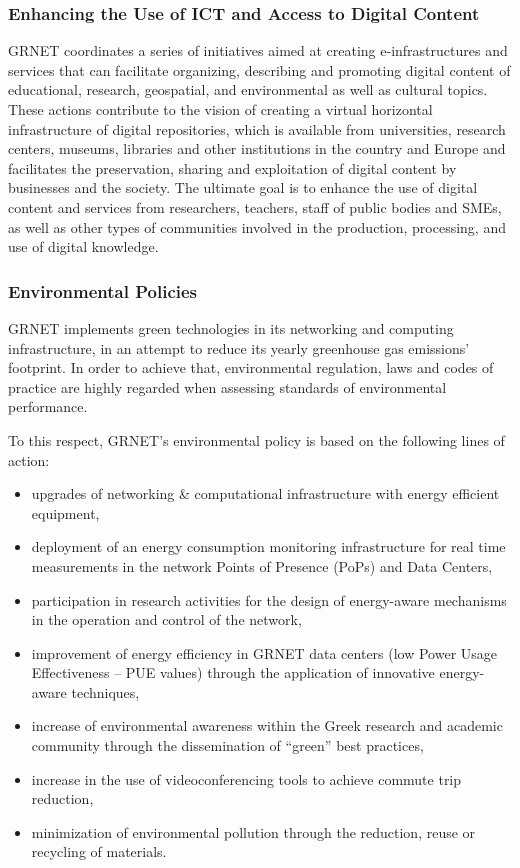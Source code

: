 \subsubsection{Enhancing the Use of ICT and Access to Digital Content}
GRNET coordinates a series of initiatives
aimed at creating e-infrastructures and services
that can facilitate organizing, describing and promoting
digital content of educational, research, geospatial,
and environmental as well as cultural topics.
These actions contribute to the vision
of creating a virtual horizontal infrastructure of digital repositories,
which is available from universities, research centers, museums, libraries
and other institutions in the country and Europe and
facilitates the preservation, sharing and exploitation
of digital content by businesses and the society.
The ultimate goal is to enhance the use of digital content
and services from researchers, teachers, staff of public bodies and SMEs,
as well as other types of communities involved in
the production, processing, and use of digital knowledge.

\subsubsection{Environmental Policies}
GRNET implements green technologies
in its networking and computing infrastructure,
in an attempt to reduce its yearly greenhouse gas emissions’ footprint.
In order to achieve that,
environmental regulation, laws and codes of practice
are highly regarded when assessing standards of environmental performance.

To this respect, GRNET’s environmental policy is based
on the following lines of action:

\begin{itemize}
	\item upgrades of networking \& computational infrastructure
	with energy efficient equipment,
	\item deployment of an energy consumption monitoring infrastructure
	for real time measurements in
	the network Points of Presence (PoPs) and Data Centers,
	\item participation in research activities for the design of
	energy-aware mechanisms in the operation and control of the network,
	\item improvement of energy efficiency in GRNET data centers
	(low Power Usage Effectiveness – PUE values) through
	the application of innovative energy-aware techniques,
	\item increase of environmental awareness within
	the Greek research and academic community
	through the dissemination of “green” best practices,
	\item increase in the use of videoconferencing tools
	to achieve commute trip reduction,
	\item minimization of environmental pollution through the reduction,
	reuse or recycling of materials.
\end{itemize}


